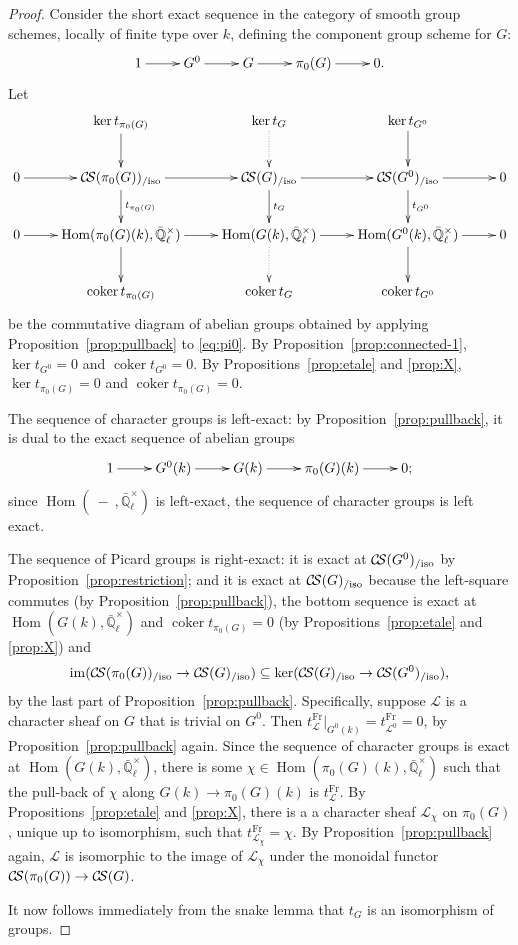 \documentclass[11pt]{amsart}
\theoremstyle{plain}
\theoremstyle{definition}
\theoremstyle{remark}
\newcommand{\EE}{\mathbb{\bar Q}_\ell}
\newcommand{\Fq}{k}
\newcommand{\Frob}{{\operatorname{Fr}}}
\DeclareMathOperator{\Hom}{Hom}
\DeclareMathOperator{\coker}{coker}
\newcommand{\cs}[1]{{\mathcal{#1}}}
\newcommand{\CS}{{\mathcal{C\hskip-1.8pt S}}}
\newcommand{\image}{{\operatorname{im}}}
\begin{document}
\begin{proof}
Consider the short exact sequence in the category of smooth group schemes, locally of finite type over $\Fq$, defining the component group scheme for $G$:
\begin{equation}\label{eq:pi0}
\xymatrix{
1 \ar[r] & G^0 \ar[r] & G \ar[r] & \pi_0(G) \ar[r] & 0.
}
\end{equation}
Let 
\[
\xymatrix{
& \ar[d] \ker t_{\pi_0(G)} & \ar@{.>}[d] \ker t_{G} & \ar[d] \ker t_{G^0} & \\
0\ar[r] & \ar[d]^{t_{\pi_0(G)}} \CS(\pi_0(G))_{/\text{iso}} \ar[r] & \ar[d]^{t_{G}} \CS(G)_{/\text{iso}} \ar[r] & \ar[d]^{t_{G^0}} \CS(G^0)_{/\text{iso}} \ar[r] & 0\\
0 \ar[r] & \ar[d] \Hom(\pi_0(G)(\Fq),\EE^\times) \ar[r] & \ar@{.>}[d] \Hom(G(\Fq),\EE^\times) \ar[r] & \ar[d] \Hom(G^0(\Fq),\EE^\times) \ar[r] & 0\\
& \coker t_{\pi_0(G)} & \coker t_{G} &  \coker t_{G^0} & \\
}
\]
be the commutative diagram of abelian groups obtained by applying Proposition~\ref{prop:pullback} to \eqref{eq:pi0}.
By Proposition~\ref{prop:connected-1}, $\ker t_{G^0} =0$ and $\coker t_{G^0}=0$. By Propositions~\ref{prop:etale} and \ref{prop:X}, $\ker t_{\pi_0(G)}=0$ and $\coker t_{\pi_0(G)}=0$. 


The sequence of character groups is left-exact: by Proposition~\ref{prop:pullback}, it is dual to the exact sequence of abelian groups
\begin{equation}\label{eq:pi0}
\xymatrix{
1 \ar[r] & G^0(\Fq) \ar[r] & G(\Fq) \ar[r] & \pi_0(G)(\Fq) \ar[r] & 0;
}
\end{equation}
since $\Hom(\ - \ ,\EE^\times)$ is left-exact, the sequence of character groups is left exact. 

The sequence of Picard groups is right-exact:  it is exact at $\CS(G^0)_{/\text{iso}}$ by Proposition~\ref{prop:restriction}; and it is exact at $\CS(G)_{/\text{iso}}$ because the left-square commutes (by Proposition~\ref{prop:pullback}), the bottom sequence is exact at $\Hom(G(\Fq),\EE^\times)$ and $\coker t_{\pi_0(G)} =0$ (by Propositions~\ref{prop:etale} and \ref{prop:X}) and
\[
\image(\CS(\pi_0(G))_{/\text{iso}} \to \CS(G)_{/\text{iso}}) \subseteq \ker(\CS(G)_{/\text{iso}} \to \CS(G^0)_{/\text{iso}}),
\]
by the last part of Proposition~\ref{prop:pullback}. Specifically, suppose $\cs{L}$ is a character sheaf on $G$ that is trivial on $G^0$. Then $t^\Frob_\cs{L}\vert_{G^0(\Fq)} = t^\Frob_{\cs{L}^0} =0$, by Proposition~\ref{prop:pullback} again. Since the sequence of character groups is exact at $\Hom(G(\Fq),\EE^\times)$, there is some $\chi \in \Hom(\pi_0(G)(\Fq),\EE^\times)$ such that the pull-back of $\chi$ along $G(\Fq)\to \pi_0(G)(\Fq)$ is $t^\Frob_\cs{L}$. By Propositions~\ref{prop:etale} and \ref{prop:X}, there is a a character sheaf $\cs{L}_\chi$ on $\pi_0(G)$, unique up to isomorphism, such that $t^\Frob_{\cs{L}_\chi} = \chi$. By Proposition~\ref{prop:pullback} again, $\cs{L}$ is isomorphic to the image of $\cs{L}_\chi$ under the monoidal functor $\CS(\pi_0(G)) \to \CS(G)$.

It now follows immediately from the snake lemma that $t_{G}$ is an isomorphism of groups.
\end{proof}
\end{document}
